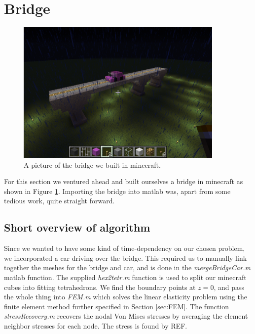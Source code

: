 \section{Bridge}

\begin{figure}
\center
\includegraphics[trim=0cm 5cm 7cm 7cm, clip=true, width=0.9\textwidth]{pic_bridge}
\caption{A picture of the bridge we built in minecraft.}
\label{fig:picBridge}
\end{figure}


For this section we ventured ahead and built ourselves a bridge in minecraft as shown in Figure \ref{fig:picBridge}. Importing the bridge into matlab was, apart from some tedious work, quite straight forward.


\subsection{Short overview of algorithm}
Since we wanted to have some kind of time-dependency on our chosen problem, we incorporated a car driving over the bridge. This required us to manually link together the meshes for the bridge and car, and is done in the \textit{mergeBridgeCar.m} matlab function. The supplied \textit{hex2tetr.m} function is used to split our minecraft cubes into fitting tetrahedrons. We find the boundary points at $z = 0$, and pass the whole thing into \textit{FEM.m} which solves the linear elasticity problem using the finite element method further specified in Section \ref{sec:FEM}. The function \textit{stressRecovery.m} recovers the nodal Von Mises stresses by averaging the element neighbor stresses for each node. The stress is found by REF.


